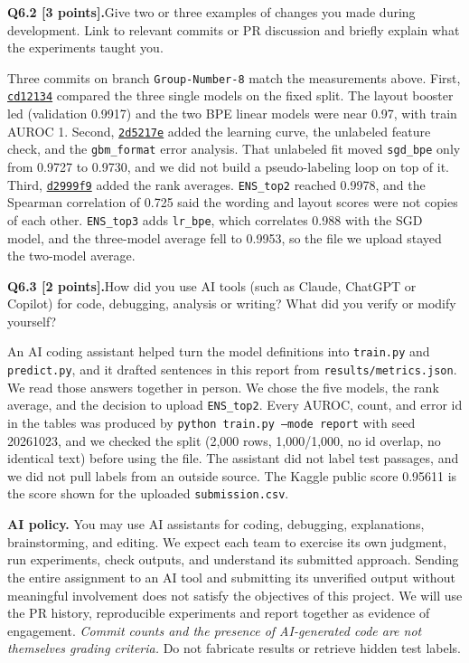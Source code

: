 \documentclass[11pt,letterpaper]{article}
\newcommand{\question}[2]{\needspace{4\baselineskip}\par\addvspace{0.45em}\noindent\textbf{#1}\quad #2\par\nobreak\vspace{0.1em}}
\begin{document}
\question{Q6.2 [3 points].}{Give two or three examples of changes you made during development. Link to relevant commits or PR discussion and briefly explain what the experiments taught you.}

Three commits on branch \texttt{Group-Number-8} match the measurements above. First, \href{https://github.com/CosineF/team8-human-or-ai-submissions/commit/cd121343e80a7b5ebb6f3b1ef78d2142da0bc82e}{\texttt{cd12134}} compared the three single models on the fixed split. The layout booster led (validation 0.9917) and the two BPE linear models were near 0.97, with train AUROC 1. Second, \href{https://github.com/CosineF/team8-human-or-ai-submissions/commit/2d5217e84deb5d3ecfd19bc3f10e7f2fcabfe383}{\texttt{2d5217e}} added the learning curve, the unlabeled feature check, and the \texttt{gbm\_format} error analysis. That unlabeled fit moved \texttt{sgd\_bpe} only from 0.9727 to 0.9730, and we did not build a pseudo-labeling loop on top of it. Third, \href{https://github.com/CosineF/team8-human-or-ai-submissions/commit/d2999f96dfc1cec71d096be9914bc20ac2ce67cf}{\texttt{d2999f9}} added the rank averages. \texttt{ENS\_top2} reached 0.9978, and the Spearman correlation of 0.725 said the wording and layout scores were not copies of each other. \texttt{ENS\_top3} adds \texttt{lr\_bpe}, which correlates 0.988 with the SGD model, and the three-model average fell to 0.9953, so the file we upload stayed the two-model average.

\question{Q6.3 [2 points].}{How did you use AI tools (such as Claude, ChatGPT or Copilot) for code, debugging, analysis or writing? What did you verify or modify yourself?}

An AI coding assistant helped turn the model definitions into \texttt{train.py} and \texttt{predict.py}, and it drafted sentences in this report from \texttt{results/metrics.json}. We read those answers together in person. We chose the five models, the rank average, and the decision to upload \texttt{ENS\_top2}. Every AUROC, count, and error id in the tables was produced by \texttt{python train.py --mode report} with seed 20261023, and we checked the split (2{,}000 rows, 1{,}000/1{,}000, no id overlap, no identical text) before using the file. The assistant did not label test passages, and we did not pull labels from an outside source. The Kaggle public score 0.95611 is the score shown for the uploaded \texttt{submission.csv}.

\textbf{AI policy.} You may use AI assistants for coding, debugging, explanations, brainstorming, and editing. We expect each team to exercise its own judgment, run experiments, check outputs, and understand its submitted approach. Sending the entire assignment to an AI tool and submitting its unverified output without meaningful involvement does not satisfy the objectives of this project. We will use the PR history, reproducible experiments and report together as evidence of engagement. \emph{Commit counts and the presence of AI-generated code are not themselves grading criteria.} Do not fabricate results or retrieve hidden test labels.
\end{document}
